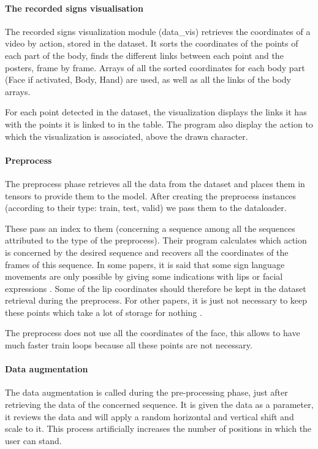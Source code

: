 \paragraph{The recorded signs visualisation}

The recorded signs visualization module (data\_vis) retrieves the coordinates of a video by action, stored in the dataset.
It sorts the coordinates of the points of each part of the body, finds the different links between each point and the posters, frame by frame. Arrays of all the sorted coordinates for each body part (Face if activated, Body, Hand) are used, as well as all the links of the body arrays.

For each point detected in the dataset, the visualization displays the links it has with the points it is linked to in the table. The program also display the action to which the visualization is associated, above the drawn character.

\paragraph{Preprocess}

The preprocess phase retrieves all the data from the dataset and places them in tensors to provide them to the model.
After creating the preprocess instances (according to their type: train, test, valid) we pass them to the dataloader. 

These pass an index to them (concerning a sequence among all the sequences attributed to the type of the preprocess). Their program calculates which action is concerned by the desired sequence and recovers all the coordinates of the frames of this sequence. 
In some papers, it is said that some sign language movements are only possible by giving some indications with lips or facial expressions \cite{cooper2011sign}. Some of the lip coordinates should therefore be kept in the dataset retrieval during the preprocess. For other papers, it is just not necessary to keep these points which take a lot of storage for nothing \cite{dreuw2007speech}.

The preprocess does not use all the coordinates of the face, this allows to have much faster train loops because all these points are not necessary.

\paragraph{Data augmentation}

The data augmentation is called during the pre-processing phase, just after retrieving the data of the concerned sequence. It is given the data as a parameter, it reviews the data and will apply a random horizontal and vertical shift and scale to it. This process artificially increases the number of positions in which the user can stand.

